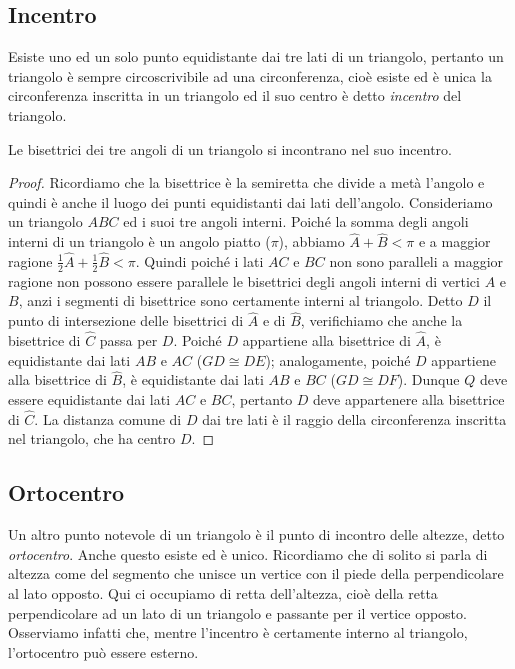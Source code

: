 \subsection{Incentro}

Esiste uno ed un solo punto equidistante dai tre lati di un triangolo, pertanto un triangolo è sempre circoscrivibile ad una circonferenza, cioè esiste ed è unica la circonferenza inscritta in un triangolo ed il suo centro è detto \emph{incentro} del triangolo.

\begin{teorema}
Le bisettrici dei tre angoli di un triangolo si incontrano nel suo incentro.
\end{teorema}

\begin{proof}
Ricordiamo che la bisettrice è la semiretta che divide a metà l'angolo e quindi è anche il luogo dei punti equidistanti dai lati dell'angolo. Consideriamo un triangolo $ABC$ ed i suoi tre angoli interni. Poiché la somma degli angoli interni di un triangolo è un angolo piatto ($\pi$), abbiamo $\widehat{A}+\widehat{B}<\pi$ e a maggior ragione $\frac{1}{2}\widehat{A}+\frac{1}{2}\widehat{B}<\pi$. Quindi poiché i lati $AC$ e $BC$ non sono paralleli a maggior ragione non possono essere parallele le bisettrici degli angoli interni di vertici $A$ e $B$, anzi i segmenti di bisettrice sono certamente interni al triangolo. Detto $D$ il punto di intersezione delle bisettrici di $\widehat{A}$ e di $\widehat{B}$, verifichiamo che anche la bisettrice di $\widehat{C}$ passa per $D$. Poiché $D$ appartiene alla bisettrice di $\widehat{A}$, è equidistante dai lati $AB$ e $AC$ ($GD\cong DE$); analogamente, poiché $D$ appartiene alla bisettrice di $\widehat{B}$, è equidistante dai lati $AB$ e $BC$ ($GD\cong DF$). Dunque $Q$ deve essere equidistante dai lati $AC$ e $BC$, pertanto $D$ deve appartenere alla bisettrice di $\widehat{C}$. La distanza comune di $D$ dai tre lati è il raggio della circonferenza inscritta nel triangolo, che ha centro $D$.
\end{proof}

\subsection{Ortocentro}

Un altro punto notevole di un triangolo è il punto di incontro delle altezze, detto \emph{ortocentro}. Anche questo esiste ed è unico. Ricordiamo che di solito si parla di altezza come del segmento che unisce un vertice con il piede della perpendicolare al lato opposto. Qui ci occupiamo di retta dell'altezza, cioè della retta perpendicolare ad un lato di un triangolo e passante per il vertice opposto. Osserviamo infatti che, mentre l'incentro è certamente interno al triangolo, l'ortocentro può essere esterno.


